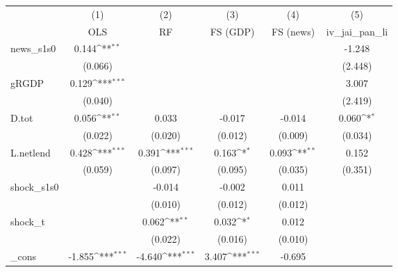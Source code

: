 {
\def\sym#1{\ifmmode^{#1}\else\(^{#1}\)\fi}
\begin{tabular}{l*{5}{c}}
\toprule
            &\multicolumn{1}{c}{(1)}&\multicolumn{1}{c}{(2)}&\multicolumn{1}{c}{(3)}&\multicolumn{1}{c}{(4)}&\multicolumn{1}{c}{(5)}\\
            &\multicolumn{1}{c}{OLS}&\multicolumn{1}{c}{RF}&\multicolumn{1}{c}{FS (GDP)}&\multicolumn{1}{c}{FS (news)}&\multicolumn{1}{c}{iv\_jai\_pan\_li}\\
\midrule
news\_s1s0   &       0.144\sym{**} &                     &                     &                     &      -1.248         \\
            &     (0.066)         &                     &                     &                     &     (2.448)         \\
\addlinespace
gRGDP       &       0.129\sym{***}&                     &                     &                     &       3.007         \\
            &     (0.040)         &                     &                     &                     &     (2.419)         \\
\addlinespace
D.tot       &       0.056\sym{**} &       0.033         &      -0.017         &      -0.014         &       0.060\sym{*}  \\
            &     (0.022)         &     (0.020)         &     (0.012)         &     (0.009)         &     (0.034)         \\
\addlinespace
L.netlend   &       0.428\sym{***}&       0.391\sym{***}&       0.163\sym{*}  &       0.093\sym{**} &       0.152         \\
            &     (0.059)         &     (0.097)         &     (0.095)         &     (0.035)         &     (0.351)         \\
\addlinespace
shock\_s1s0  &                     &      -0.014         &      -0.002         &       0.011         &                     \\
            &                     &     (0.010)         &     (0.012)         &     (0.012)         &                     \\
\addlinespace
shock\_t     &                     &       0.062\sym{**} &       0.032\sym{*}  &       0.012         &                     \\
            &                     &     (0.022)         &     (0.016)         &     (0.010)         &                     \\
\addlinespace
\_cons      &      -1.855\sym{***}&      -4.640\sym{***}&       3.407\sym{***}&      -0.695         &                     \\

\end{tabular}}
